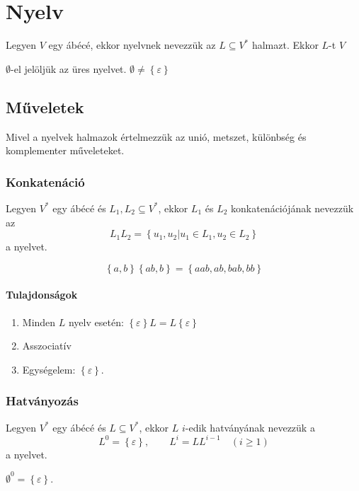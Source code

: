 \section{Nyelv}
\begin{definition*}[nyelv]
	Legyen $V$ egy ábécé, ekkor nyelvnek nevezzük az $ L \subseteq V^* $ halmazt. Ekkor $L$-t $V$
\end{definition*}

\begin{notation*}
	$ \emptyset $-el jelöljük az üres nyelvet. $\emptyset \ne \left\lbrace \varepsilon \right\rbrace $ 
\end{notation*}

\subsection{Műveletek}
\noindent
Mivel a nyelvek halmazok értelmezzük az unió, metszet, különbség és komplementer műveleteket. 
\subsubsection{Konkatenáció}

\begin{definition*}
	Legyen $V^*$ egy ábécé és $L_1, L_2 \subseteq V^*$, ekkor $L_1$ és $L_2$ konkatenációjának nevezzük az 
	\[
	L_1L_2 = \left\lbrace u_1,u_2 | u_1 \in L_1, u_2 \in L_2 \right\rbrace 
	\]
	a nyelvet.
\end{definition*}
\begin{example}
	\[
	\left\lbrace a,b \right\rbrace \left\lbrace ab,b \right\rbrace = \left\lbrace aab, ab, bab, bb \right\rbrace   
	\]
\end{example}
\paragraph{Tulajdonságok}
\begin{enumerate}
	\item Minden $ L $ nyelv esetén: $ \left\lbrace \varepsilon \right\rbrace L = L \left\lbrace \varepsilon \right\rbrace $
	\item Asszociatív
	\item Egységelem: $ \left\lbrace \varepsilon \right\rbrace $.
\end{enumerate}

\subsubsection{Hatványozás}
\begin{definition*}
	Legyen $V^*$ egy ábécé és $L \subseteq V^* $, ekkor $L$ $i$-edik hatványának nevezzük a
	\[
	L^0 = \left\lbrace \varepsilon \right\rbrace, \qquad L^i = LL^{i-1} \quad (i \ge 1)
	\]
	a nyelvet.
\end{definition*}
\begin{remark}
	$ \emptyset^0 = \left\lbrace \varepsilon \right\rbrace $. 
\end{remark}
